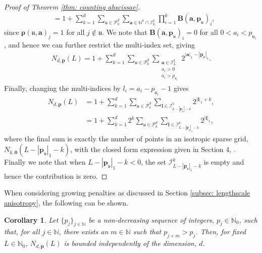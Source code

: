 \documentclass[pdflatex,sn-mathphys-num]{sn-jnl}%
\theoremstyle{thmstyleone}%
\newtheorem{corollary}{Corollary}
\theoremstyle{thmstyletwo}%
\theoremstyle{thmstylethree}%
\begin{document}
\begin{proof}[Proof of Theorem \ref{thm: counting abscissae}]
\begin{align}
        &= 1 +\sum_{k=1}^d\sum_{\mathfrak{u}\in\mathcal{P}^d_k}\sum_{\mathbf{a}\in\mathbb{N}^k\cap\mathcal{I}^k_L}\prod_{i=1}^k\mathbf{B}(\mathbf{a},\mathbf{p}_\mathfrak{u})_i,\nonumber
    \end{align}
    since \(\boldsymbol{\rho}(\mathfrak{u},\mathbf{a})_j=1\) for all \(j\notin \mathfrak{u}\). We note that \(\mathbf{B}(\mathbf{a},\mathbf{p}_{\mathfrak{u}})_i=0\) for all \(0<a_i<p_{\mathfrak{u}_i}\), and hence we can further restrict the multi-index set, giving
    \begin{align}
        N_{d,\mathbf{p}}(L)= 1 + \sum_{k=1}^d\sum_{\mathfrak{u}\in\mathcal{P}^d_k}\sum_{\substack{\mathbf{a}\in\mathcal{I}^k_L\\a_i>0\\a_i>p_{\mathfrak{u}_i}}}2^{|\mathbf{a}|_1-|\mathbf{p}_{\mathfrak{u}}|_1}.\nonumber
    \end{align}
    Finally, changing the multi-indices by \(l_i=a_i-p_{\mathfrak{u}_i}-1\) gives
    \begin{align}
        N_{d,\mathbf{p}}(L) &= 1 + \sum_{k=1}^d\sum_{\mathfrak{u}\in\mathcal{P}^d_k}\sum_{\boldsymbol{l}\in\mathcal{I}^k_{L-|\mathbf{p}_{\mathfrak{u}}|-k}}2^{|\boldsymbol{l}|_1+k},\nonumber\\
        &= 1 + \sum_{k=1}^d2^k\sum_{\mathfrak{u}\in\mathcal{P}^d_k}\sum_{\boldsymbol{l}\in\mathcal{I}^k_{L-|\mathbf{p}_{\mathfrak{u}}|_1-k}}2^{|\boldsymbol{l}|_1},\nonumber
    \end{align}
    where the final sum is exactly the number of points in an isotropic sparse grid, \(N_{k,\mathbf{0}}(L-|\mathbf{p}_{\mathfrak{u}}|_1-k)\), with the closed form expression given in Section 4, \cite{burkhardt2014counting}. Finally we note that when \(L-|\mathbf{p}_{\mathfrak{u}}|_1-k<0\), the set \(\mathcal{I}^k_{L-|\mathbf{p}_{\mathfrak{u}}|_1-k}\) is empty and hence the contribution is zero. 
\end{proof}
When considering growing penalties as discussed in Section \ref{subsec: lengthscale anisotropy}, the following can be shown. 
\begin{corollary}\label{cor: dimension independent points}
   Let \(\{p_j\}_{j\in\mathbb{N}}\) be a non-decreasing sequence of integers, \(p_j\in\mathbb{N}_0\), such that, for all \(j\in\mathbb{N}\), there exists an \(m\in\mathbb{N}\) such that \(p_{j+m}>p_j\). Then, for fixed \(L\in\mathbb{N}_0\), \(N_{d,\mathbf{p}}(L)\) is bounded independently of the dimension, \(d\).
\end{corollary}
\end{document}
